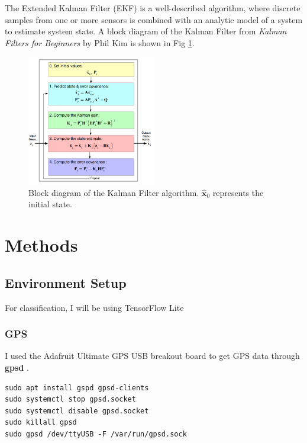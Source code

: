 \documentclass[12pt]{article}
\begin{document}
	The Extended Kalman Filter (EKF) is a well-described algorithm, where discrete samples from one or more sensors is combined with an analytic model of a system to estimate system state. A block diagram of the Kalman Filter from \textit{Kalman Filters for Beginners} by Phil Kim \cite{kim2011kalman} is shown in Fig \ref{fig:kimkalman}.
	
\begin{figure}[h]
\centering
\includegraphics[width=0.5\textwidth]{kimkalman.png} %
\caption{Block diagram of the Kalman Filter algorithm. $\hat{\mathbf{x}}_0$ represents the initial state.}
\label{fig:kimkalman}
\end{figure}

\section{Methods}\label{sec:methods}

\subsection{Environment Setup}

	For classification, I will be using TensorFlow Lite
	
\subsubsection{GPS}
	I used the Adafruit Ultimate GPS USB breakout board to get GPS data through \textbf{gpsd} \cite{townsend2023}.
	
\begin{lstlisting}
sudo apt install gspd gpsd-clients
sudo systemctl stop gpsd.socket
sudo systemctl disable gpsd.socket
sudo killall gpsd
sudo gpsd /dev/ttyUSB -F /var/run/gpsd.sock
\end{lstlisting}
\end{document}
